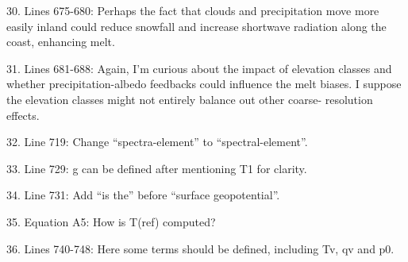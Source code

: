\documentclass[12pt,oneside,a4paper]{article}%
\begin{document}
30. Lines 675-680: Perhaps the fact that clouds and precipitation move more easily inland could reduce snowfall and increase shortwave radiation along the coast, enhancing melt. \newline

31. Lines 681-688: Again, I’m curious about the impact of elevation classes and whether precipitation-albedo feedbacks could influence the melt biases. I suppose the elevation classes might not entirely balance out other coarse- resolution effects. \newline

32. Line 719: Change “spectra-element” to “spectral-element”. \newline

33. Line 729: g can be defined after mentioning T1 for clarity. \newline

34. Line 731: Add “is the” before “surface geopotential”. \newline

35. Equation A5: How is T(ref) computed? \newline

36. Lines 740-748: Here some terms should be defined, including Tv, qv and p0.

\end{document}

